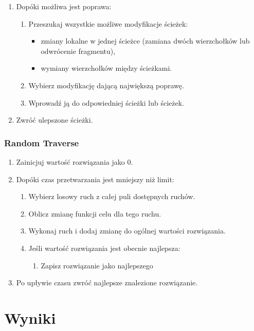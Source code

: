 \documentclass[11pt]{article}
\begin{document}
\begin{enumerate}
  \item Dopóki możliwa jest poprawa:
  \begin{enumerate}
    \item Przeszukaj wszystkie możliwe modyfikacje ścieżek:
    \begin{itemize}
      \item zmiany lokalne w jednej ścieżce (zamiana dwóch wierzchołków lub odwrócenie fragmentu),
      \item wymiany wierzchołków między ścieżkami.
    \end{itemize}
    \item Wybierz modyfikację dającą największą poprawę.
    \item Wprowadź ją do odpowiedniej ścieżki lub ścieżek.
  \end{enumerate}
  \item Zwróć ulepszone ścieżki.
\end{enumerate}

\subsubsection{Random Traverse}

\begin{enumerate}
    \item Zainicjuj wartość rozwiązania jako 0.
    \item Dopóki czas przetwarzania jest mniejszy niż limit:
    \begin{enumerate}
        \item Wybierz losowy ruch z całej puli dostępnych ruchów.
        \item Oblicz zmianę funkcji celu dla tego ruchu.
        \item Wykonaj ruch i dodaj zmianę do ogólnej wartości rozwiązania.
        \item Jeśli wartość rozwiązania jest obecnie najlepsza:
        \begin{enumerate}
            \item Zapisz rozwiązanie jako najlepszego
        \end{enumerate}
    \end{enumerate}
    \item Po upływie czasu zwróć najlepsze znalezione rozwiązanie.
\end{enumerate}


\section{Wyniki}\label{sec:wyniki}
\end{document}
